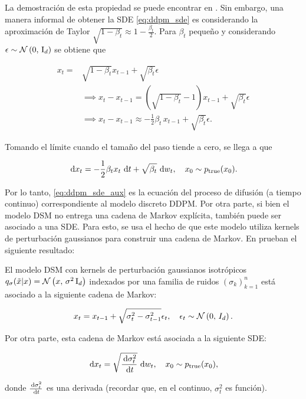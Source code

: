 La demostración de esta propiedad se puede encontrar en \cite{song2021scorebased}. Sin embargo, una manera informal de obtener la SDE \eqref{eq:ddpm_sde} es considerando la aproximación de Taylor $\sqrt{1 - \beta_t} \approx 1 - \frac{\beta_t}{2}$. Para $\beta_t$ pequeño y considerando $\epsilon\sim\mathcal{N}\left(0,\,\operatorname{I}_{d}\right)$ se obtiene que

\begin{align*}
    x_t = & \sqrt{1 - \beta_t} x_{t-1} + \sqrt{\beta_t} \epsilon                                     \\
          & \implies x_t - x_{t-1} = (\sqrt{1 - \beta_t} - 1) x_{t-1} + \sqrt{\beta_t} \epsilon      \\
          & \implies x_t - x_{t-1} \approx -\frac{1}{2}\beta_t\, x_{t-1} + \sqrt{\beta_t} \epsilon .
\end{align*}

Tomando el límite cuando el tamaño del paso tiende a cero, se llega a que

\begin{equation*}
    \label{eq:ddpm_sde_aux}
    \,\operatorname{d}\! x_t = -\frac{1}{2} \beta_t x_t \,\operatorname{d}\! t + \sqrt{\beta_t} \,\operatorname{d}\! w_t, \quad x_0\sim p_{\operatorname{true}}(x_0).
\end{equation*}

Por lo tanto, \eqref{eq:ddpm_sde_aux} es la ecuación del proceso de difusión (a tiempo continuo) correspondiente al modelo discreto DDPM. Por otra parte, si bien el modelo DSM no entrega una cadena de Markov explícita, también puede ser asociado a una SDE. Para esto, se usa el hecho de que este modelo utiliza kernels de perturbación gaussianos para construir una cadena de Markov. En \cite{song2021scorebased} prueban el siguiente resultado:

\begin{prop}
    El modelo DSM con kernels de perturbación gaussianos isotrópicos $q_{\sigma}(\tilde x|x)=\mathcal{N}\left(x,\,\sigma^2\operatorname{I}_{d}\right)$ indexados por una familia de ruidos $(\sigma_k)_{k=1}^n$ está asociado a la siguiente cadena de Markov:

    \begin{equation*}
        x_t = x_{t-1} + \sqrt{\sigma_t^2-\sigma^2_{t-1}} \epsilon_t,\quad \epsilon_t\sim\mathcal{N}\left(0,\,I_d\right).
    \end{equation*}

    Por otra parte, esta cadena de Markov está asociada a la siguiente SDE:

    \begin{equation}
        \label{eq:sdm_sde}
        \,\operatorname{d}\! x_t = \sqrt{\frac{\,\operatorname{d}\!\sigma_t^2}{\,\operatorname{d}\! t}}\,\operatorname{d}\! w_t, \quad x_0\sim p_{\operatorname{true}}(x_0),
    \end{equation}

    donde $\frac{\,\operatorname{d}\!\sigma_t^2}{\,\operatorname{d}\! t}$ es una derivada (recordar que, en el continuo, $\sigma_t^2$ es función).
\end{prop}

